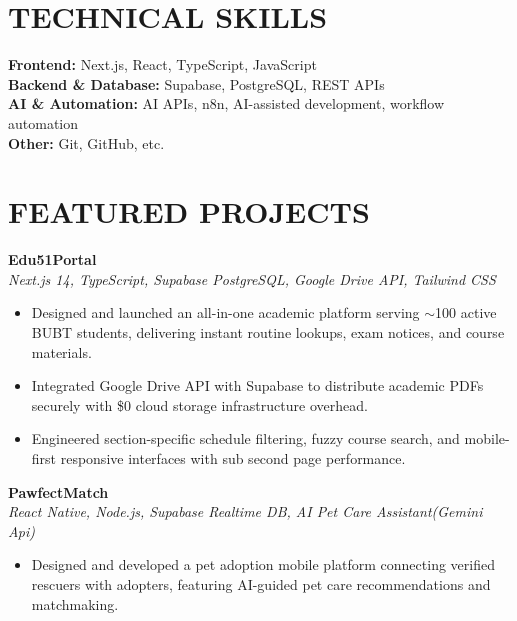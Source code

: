 \documentclass[10pt, a4paper]{article}
\begin{document}
\section{TECHNICAL SKILLS}
\small{
\textbf{Frontend:} Next.js, React, TypeScript, JavaScript \\
\textbf{Backend \& Database:} Supabase, PostgreSQL, REST APIs \\
\textbf{AI \& Automation:} AI APIs, n8n, AI-assisted development, workflow automation \\
\textbf{Other:} Git, GitHub, etc.
}
\vspace{3pt}

\section{FEATURED PROJECTS}
\vspace{-2pt}
\textbf{Edu51Portal} \\
\textit{\small Next.js 14, TypeScript, Supabase PostgreSQL, Google Drive API, Tailwind CSS}
\begin{itemize}[leftmargin=0.18in, label=\textbullet, itemsep=1pt, topsep=2pt]
  \small
  \item Designed and launched an all-in-one academic platform serving $\sim$100 active BUBT students, delivering instant routine lookups, exam notices, and course materials.
  \item Integrated Google Drive API with Supabase to distribute academic PDFs securely with \$0 cloud storage infrastructure overhead.
  \item Engineered section-specific schedule filtering, fuzzy course search, and mobile-first responsive interfaces with sub second page performance.
\end{itemize}
\vspace{3pt}

\textbf{PawfectMatch} \\
\textit{\small React Native, Node.js, Supabase Realtime DB, AI Pet Care Assistant(Gemini Api)}
\begin{itemize}[leftmargin=0.18in, label=\textbullet, itemsep=1pt, topsep=2pt]
  \small
  \item Designed and developed a pet adoption mobile platform connecting verified rescuers with adopters, featuring AI-guided pet care recommendations and matchmaking.
\end{itemize}

\clearpage
\end{document}
